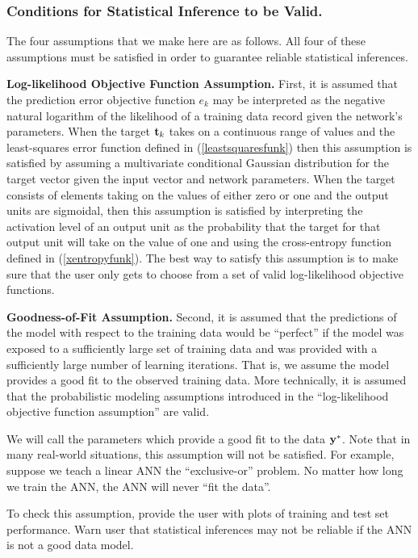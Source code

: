 \documentclass{report}
\begin{document}
\subsubsection{Conditions for Statistical Inference to be Valid.}
The four assumptions that we make here are as follows. All four of
these assumptions must be satisfied in order to guarantee reliable
statistical inferences.

{\bf Log-likelihood Objective Function Assumption.}
First, it is assumed that the prediction error objective function
$e_k$ may be interpreted as the negative natural logarithm of the
likelihood of a training data record given the network's parameters.
When the target ${\bf t}_k$ takes on a continuous range of values and
the least-squares error function defined in (\ref{leastsquaresfunk})
 then this assumption is satisfied
by assuming a multivariate conditional Gaussian distribution for the
target vector given the input vector and network parameters. When the
target consists of elements taking on the values of either zero or one
and the output units are sigmoidal,
then this assumption is satisfied by interpreting the activation level
of an output unit as the probability that the target for that output
unit will take on the value of one and using the cross-entropy
 function defined in
(\ref{xentropyfunk}).  The best way to
satisfy this assumption is to make sure that the user only gets to
choose from a set of valid log-likelihood objective functions.

{\bf Goodness-of-Fit Assumption.}
Second, it is assumed that the predictions of the model with respect
to the training data would be ``perfect'' if the model was exposed to
a sufficiently large set of training data and was provided with a
sufficiently large number of learning iterations. That is, we assume
the model provides a good fit to the observed training data. More
technically, it is assumed that the probabilistic modeling assumptions
introduced in the ``log-likelihood objective function assumption'' are
valid.

We will call the parameters which provide a good fit to the data ${\bf
y}^*$. Note that in many real-world situations, this assumption will
not be satisfied. For example, suppose we teach a linear ANN the
``exclusive-or'' problem. No matter how long we train the ANN, the ANN
will never ``fit the data''.

To check this assumption, provide the user with plots of training and
test set performance. Warn user that statistical inferences may not be
reliable if the ANN is not a good data model.
\end{document}

